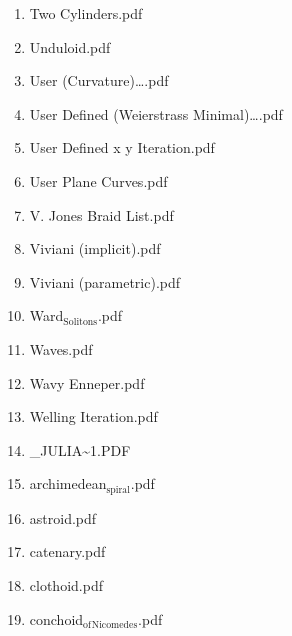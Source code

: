 \documentclass[11pt]{article}
\begin{document}
\begin{enumerate}
\begin{enumerate}
\item Two Cylinders.pdf
\label{sec-1-1-1-1-29-20-133}

\item Unduloid.pdf
\label{sec-1-1-1-1-29-20-134}

\item User (Curvature)\ldots{}.pdf
\label{sec-1-1-1-1-29-20-135}

\item User Defined (Weierstrass Minimal)\ldots{}.pdf
\label{sec-1-1-1-1-29-20-136}

\item User Defined x y Iteration.pdf
\label{sec-1-1-1-1-29-20-137}

\item User Plane Curves.pdf
\label{sec-1-1-1-1-29-20-138}

\item V. Jones Braid List.pdf
\label{sec-1-1-1-1-29-20-139}

\item Viviani (implicit).pdf
\label{sec-1-1-1-1-29-20-140}

\item Viviani (parametric).pdf
\label{sec-1-1-1-1-29-20-141}

\item Ward$_{\text{Solitons}}$.pdf
\label{sec-1-1-1-1-29-20-142}

\item Waves.pdf
\label{sec-1-1-1-1-29-20-143}

\item Wavy Enneper.pdf
\label{sec-1-1-1-1-29-20-144}

\item Welling Iteration.pdf
\label{sec-1-1-1-1-29-20-145}

\item \_JULIA\textasciitilde{}1.PDF
\label{sec-1-1-1-1-29-20-146}

\item archimedean$_{\text{spiral}}$.pdf
\label{sec-1-1-1-1-29-20-147}

\item astroid.pdf
\label{sec-1-1-1-1-29-20-148}

\item catenary.pdf
\label{sec-1-1-1-1-29-20-149}

\item clothoid.pdf
\label{sec-1-1-1-1-29-20-150}

\item conchoid$_{\text{of}}$$_{\text{Nicomedes}}$.pdf
\label{sec-1-1-1-1-29-20-151}


\end{enumerate}
\end{enumerate}
\end{document}
